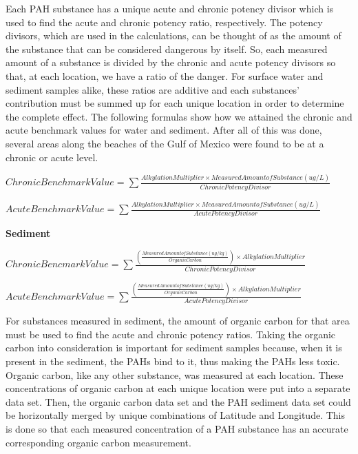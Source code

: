 \documentclass[authoryear,12pt]{elsarticle}
\begin{document}
Each PAH substance has a unique acute and chronic potency divisor which is used to find the acute and chronic potency ratio, respectively. The potency divisors, which are used in the calculations, can be thought of as the amount of the substance that can be considered dangerous by itself. So, each measured amount of a substance is divided by the chronic and acute potency divisors so that, at each location, we have a ratio of the danger. For surface water and sediment samples alike, these ratios are additive and each substances' contribution must be summed up for each unique location in order to determine the complete effect. The following formulas show how we attained the chronic and acute benchmark values for water and sediment. After all of this was done, several areas along the beaches of the Gulf of Mexico were found to be at a chronic or acute level. 

$Chronic Benchmark Value = \sum \frac{Alkylation Multiplier \times Measured Amount of Substance (ug/L)}{Chronic Potency Divisor}$

$Acute Benchmark Value = \sum \frac{Alkylation Multiplier \times Measured Amount of Substance (ug/L)}{Acute Potency Divisor}$
\begin{center} \textbf{Sediment} \end{center}

$Chronic Bencmark Value = \sum \frac{(\frac{Measured Amount of Substance (ug/kg)}{Organic Carbon}) \times Alkylation Multiplier}{Chronic Potency Divisor}$

$Acute Benchmark Value = \sum \frac{(\frac{Measured Amount of Substance (ug/kg)}{Organic Carbon}) \times Alkylation Multiplier}{Acute Potency Divisor}$

For substances measured in sediment, the amount of organic carbon for that area must  be used to find the acute and chronic potency ratios. Taking the organic carbon into consideration is important for sediment samples because, when it is present in the sediment, the PAHs bind to it, thus making the PAHs less toxic. Organic carbon, like any other substance, was measured at each location. These concentrations of organic carbon at each unique location were put into a separate data set. Then, the organic carbon data set and the PAH sediment data set could be horizontally merged by unique combinations of Latitude and Longitude. This is done so that each measured concentration of a PAH substance has an accurate corresponding organic carbon measurement. 
\end{document}
